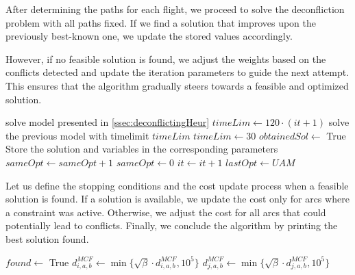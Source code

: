 \documentclass[../thesis.tex]{subfiles}
\begin{document}
After determining the paths for each flight, we proceed to solve the deconfliction problem with all paths fixed. If we find a solution that improves upon the previously best-known one, we update the stored values accordingly.

However, if no feasible solution is found, we adjust the weights based on the conflicts detected and update the iteration parameters to guide the next attempt. This ensures that the algorithm gradually steers towards a feasible and optimized solution.

\begin{algorithm}[H]
\begin{algorithmic}
    \STATE solve model presented in \ref{ssec:deconflictingHeur}
    \STATE $timeLim\gets 120\cdot (it+1)$
    \STATE solve the previous model with timelimit $timeLim$
    \STATE $timeLim\gets 30$
    \ENDIF
    \STATE $obtainedSol\gets$ True
    \STATE Store the solution and variables in the corresponding parameters
    \ENDIF
    \ENDIF
    \STATE $sameOpt\gets sameOpt+1$
    \ELSE
    \STATE $sameOpt\gets0$
    \ENDIF
    \STATE $it\gets it+1$
    \STATE $lastOpt\gets UAM$
\end{algorithmic}
\end{algorithm}
Let us define the stopping conditions and the cost update process when a feasible solution is found.
If a solution is available, we update the cost only for arcs where a constraint was active. Otherwise, we adjust the cost for all arcs that could potentially lead to conflicts.
Finally, we conclude the algorithm by printing the best solution found.

\begin{algorithm}[H]
\begin{algorithmic}
    \STATE $found\gets$ True
    \ELSE
    \STATE $d^{MCF}_{i,a,b}\gets\min\{\sqrt\beta\cdot d^{MCF}_{i,a,b},10^5\}$
    \STATE $d^{MCF}_{j,a,b}\gets\min\{\sqrt\beta\cdot d^{MCF}_{j,a,b},10^5\}$
    \ENDFOR
    \ENDFOR
    \ELSE
\end{algorithmic}
\end{algorithm}
\end{document}
